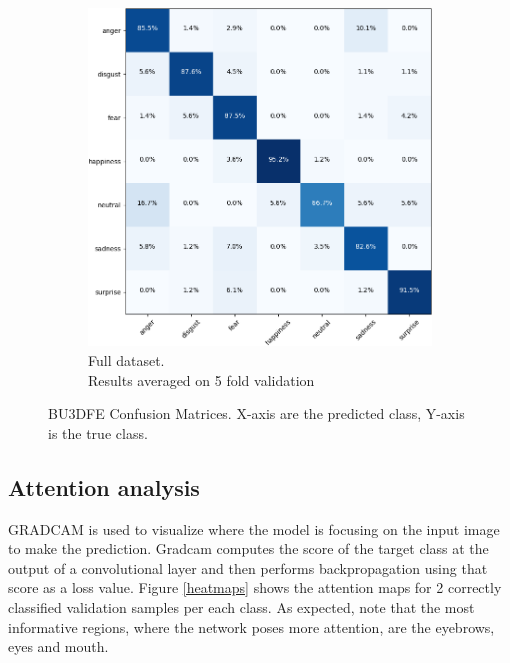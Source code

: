 \begin{figure}[H]
    \begin{subfigure}[t]{0.4\textwidth}
        \includegraphics[width=\linewidth]{Images/conf_mat/conf_mat_BU3DFE_7.png}
        \caption{Full dataset. \\
        Results averaged on 5 fold validation}
        \label{BU3DFE 7 classes}
    \end{subfigure}
    \caption{BU3DFE Confusion Matrices. X-axis are the predicted class, Y-axis is the true class.}
    \label{conf_mat}
\end{figure}


    
   
\subsection{Attention analysis}
GRADCAM \cite{Gradcam} is used to visualize where the model is focusing on the input image to make the prediction. Gradcam computes the score of the target class at the output of a convolutional layer and then performs backpropagation using that score as a loss value. Figure \ref{heatmaps} shows the attention maps for 2 correctly classified validation samples per each class. As expected, note that the most informative regions, where the network poses more attention, are the eyebrows, eyes and mouth.


